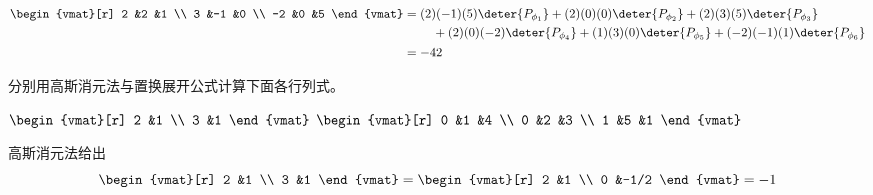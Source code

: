 \begin{exercises}
\begin{answer}
\begin{exparts}
\begin{align*}
            \begin{vmat}[r]
              2  &2  &1  \\
              3  &-1 &0  \\
              -2 &0  &5
            \end{vmat}
            &=
            \begin{aligned}[t]
              &(2)(-1)(5)\deter{P_{\phi_1}}
              +(2)(0)(0)\deter{P_{\phi_2}}
              +(2)(3)(5)\deter{P_{\phi_3}} \\
              &\hbox{}\quad\hbox{}
              +(2)(0)(-2)\deter{P_{\phi_4}}
              +(1)(3)(0)\deter{P_{\phi_5}}
              +(-2)(-1)(1)\deter{P_{\phi_6}}
            \end{aligned}                      \\
            &=-42
        \end{align*}
      \end{exparts}
    \end{answer}
  \recommended \item
    分别用高斯消元法与置换展开公式计算下面各行列式。
    \begin{exparts*}
      \partsitem \( \begin{vmat}[r]
                 2  &1  \\
                 3  &1
               \end{vmat}   \)
      \partsitem \( \begin{vmat}[r]
                  0  &1  &4  \\
                  0  &2  &3  \\
                  1  &5  &1
               \end{vmat}  \)
    \end{exparts*}
    \begin{answer}
      \begin{exparts}
        \partsitem 高斯消元法给出
          \begin{equation*}
             \begin{vmat}[r]
                 2  &1  \\
                 3  &1
             \end{vmat}
             =
             \begin{vmat}[r]
                 2  &1  \\
                 0  &-1/2
             \end{vmat}
             =-1
          \end{equation*}

\end{exparts}
\end{answer}
\end{exercises}
